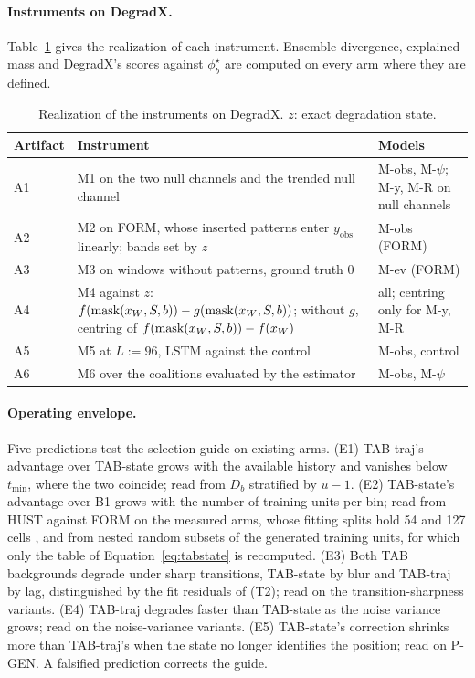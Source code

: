\documentclass{article}
\begin{document}
\paragraph{Instruments on DegradX.} Table~\ref{tab:instruments} gives the realization of each instrument. Ensemble divergence, explained mass and DegradX's scores against $\phi^\star_b$ are computed on every arm where they are defined.

\begin{table}[t]
\caption{Realization of the instruments on DegradX. $z$: exact degradation state.}
\label{tab:instruments}
\centering
\small
\begin{tabularx}{\linewidth}{@{}l>{\raggedright\arraybackslash}X>{\raggedright\arraybackslash}p{2.7cm}@{}}
\toprule
Artifact & Instrument & Models \\
\midrule
A1 & M1 on the two null channels and the trended null channel & M-obs, M-$\psi$; M-y, M-R on null channels \\
A2 & M2 on FORM, whose inserted patterns enter $y_{\mathrm{obs}}$ linearly; bands set by $z$ & M-obs (FORM) \\
A3 & M3 on windows without patterns, ground truth 0 & M-ev (FORM) \\
A4 & M4 against $z$: $f(\operatorname{mask}(x_W,S,b))-g(\operatorname{mask}(x_W,S,b))$; without $g$, centring of $f(\operatorname{mask}(x_W,S,b))-f(x_W)$ & all; centring only for M-y, M-R \\
A5 & M5 at $L:=96$, LSTM against the control & M-obs, control \\
A6 & M6 over the coalitions evaluated by the estimator & M-obs, M-$\psi$ \\
\bottomrule
\end{tabularx}
\end{table}

\paragraph{Operating envelope.} Five predictions test the selection guide on existing arms. (E1) TAB-traj's advantage over TAB-state grows with the available history and vanishes below $t_{\min}$, where the two coincide; read from $D_b$ stratified by $u-1$. (E2) TAB-state's advantage over B1 grows with the number of training units per bin; read from HUST against FORM on the measured arms, whose fitting splits hold 54 and 127 cells \citep{degradx2026}, and from nested random subsets of the generated training units, for which only the table of Equation~\eqref{eq:tabstate} is recomputed. (E3) Both TAB backgrounds degrade under sharp transitions, TAB-state by blur and TAB-traj by lag, distinguished by the fit residuals of (T2); read on the transition-sharpness variants. (E4) TAB-traj degrades faster than TAB-state as the noise variance grows; read on the noise-variance variants. (E5) TAB-state's correction shrinks more than TAB-traj's when the state no longer identifies the position; read on P-GEN. A falsified prediction corrects the guide.
\end{document}
